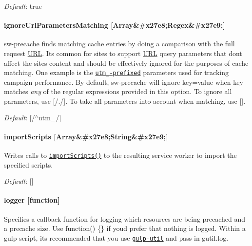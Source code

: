 {\itshape Default}\+: {\ttfamily true}

\paragraph*{ignore\+Url\+Parameters\+Matching \mbox{[}Array\&\#x27e8;Regex\&\#x27e9;\mbox{]}}

{\ttfamily sw-\/precache} finds matching cache entries by doing a comparison with the full request \mbox{\hyperlink{namespace_u_r_l}{U\+RL}}. It\textquotesingle{}s common for sites to support \mbox{\hyperlink{namespace_u_r_l}{U\+RL}} query parameters that don\textquotesingle{}t affect the site\textquotesingle{}s content and should be effectively ignored for the purposes of cache matching. One example is the \href{https://support.google.com/analytics/answer/1033867}{\tt {\ttfamily utm\+\_\+}-\/prefixed} parameters used for tracking campaign performance. By default, {\ttfamily sw-\/precache} will ignore {\ttfamily key=value} when {\ttfamily key} matches {\itshape any} of the regular expressions provided in this option. To ignore all parameters, use {\ttfamily \mbox{[}/./\mbox{]}}. To take all parameters into account when matching, use {\ttfamily \mbox{[}\mbox{]}}.

{\itshape Default}\+: {\ttfamily \mbox{[}/$^\wedge$utm\+\_\+/\mbox{]}}

\paragraph*{import\+Scripts \mbox{[}Array\&\#x27e8;String\&\#x27e9;\mbox{]}}

Writes calls to \href{https://developer.mozilla.org/en-US/docs/Web/API/Web_Workers_API/basic_usage#Importing_scripts_and_libraries}{\tt {\ttfamily import\+Scripts()}} to the resulting service worker to import the specified scripts.

{\itshape Default}\+: {\ttfamily \mbox{[}\mbox{]}}

\paragraph*{logger \mbox{[}function\mbox{]}}

Specifies a callback function for logging which resources are being precached and a precache size. Use {\ttfamily function() \{\}} if you\textquotesingle{}d prefer that nothing is logged. Within a {\ttfamily gulp} script, it\textquotesingle{}s recommended that you use \href{https://github.com/gulpjs/gulp-util}{\tt {\ttfamily gulp-\/util}} and pass in {\ttfamily gutil.\+log}.

